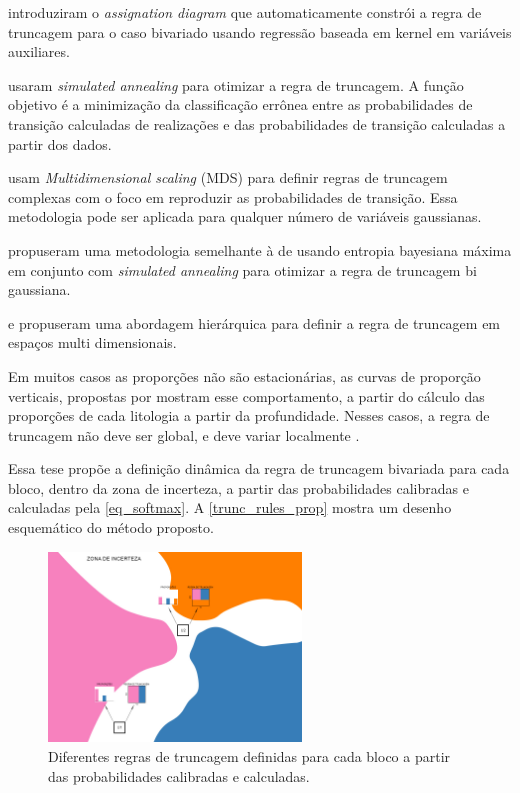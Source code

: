  introduziram o \textit{assignation diagram} que automaticamente constrói a regra de truncagem para o caso bivariado usando regressão baseada em kernel em variáveis auxiliares.

 usaram \textit{simulated annealing} para otimizar a regra de truncagem. A função objetivo é a minimização da classificação errônea entre as probabilidades de transição calculadas de realizações e das probabilidades de transição calculadas a partir dos dados.

 usam \textit{Multidimensional scaling} (MDS) para definir regras de truncagem complexas com o foco em reproduzir as probabilidades de transição. Essa metodologia pode ser aplicada para qualquer número de variáveis gaussianas.

 propuseram uma metodologia semelhante à de  usando entropia bayesiana máxima em conjunto com \textit{simulated annealing} para otimizar a regra de truncagem bi gaussiana.

 e  propuseram uma abordagem hierárquica para definir a regra de truncagem em espaços multi dimensionais.

Em muitos casos as proporções não são estacionárias, as curvas de proporção verticais, propostas por  mostram esse comportamento, a partir do cálculo das proporções de cada litologia a partir da profundidade. Nesses casos, a regra de truncagem não deve ser global, e deve variar localmente \cite{sadeghi_optimizing}.

Essa tese propõe a definição dinâmica da regra de truncagem bivariada para cada bloco, dentro da zona de incerteza, a partir das probabilidades calibradas e calculadas pela \autoref{eq_softmax}. A \autoref{trunc_rules_prop} mostra um desenho esquemático do método proposto.

\begin{figure}[!ht]
	\caption{\label{trunc_rules_prop}Diferentes regras de truncagem definidas para cada bloco a partir das probabilidades calibradas e calculadas.}
	\begin{center}
		\includegraphics[width=0.6\textwidth]{capitulo_3/trunc_rules_prop.jpg}
	\end{center}
\end{figure}

